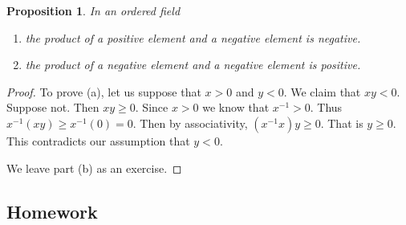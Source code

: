 \documentclass[11pt]{article}
\newtheorem{proposition}[theorem]{Proposition}
\theoremstyle{definition}
\begin{document}
\begin{proposition} In an ordered field
  \begin{enumerate}
    \item[(a)] the product of a positive element and a negative element is negative.
    \item[(b)] the product of a negative element and a negative element is positive.
  \end{enumerate}
\end{proposition}
\begin{proof}
  To prove (a), let us suppose that $x > 0$ and $y < 0$. We claim that $xy < 0$. Suppose not. Then $xy \geq 0$. Since $x > 0$ we know that
  $x^{-1} > 0$. Thus $x^{-1}(xy) \geq x^{-1}(0) = 0$. Then by associativity, $(x^{-1}x)y \geq 0$. That is $y \geq 0$. This 
  contradicts our assumption that $y < 0$.

  We leave part (b) as an exercise.
\end{proof}


\newpage \subsection{Homework}  
\end{document}
